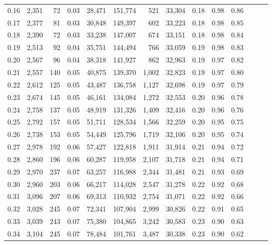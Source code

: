 \begin{tabular}{rrrrrrrrrrrrrr}
0.16 &  2,351 &   72 &  0.03 &   28,471 &  151,774 &     521 &  33,304 &  0.18 &  0.98 &      0.86 \\
0.17 &  2,377 &   81 &  0.03 &   30,848 &  149,397 &     602 &  33,223 &  0.18 &  0.98 &      0.85 \\
0.18 &  2,390 &   72 &  0.03 &   33,238 &  147,007 &     674 &  33,151 &  0.18 &  0.98 &      0.84 \\
0.19 &  2,513 &   92 &  0.04 &   35,751 &  144,494 &     766 &  33,059 &  0.19 &  0.98 &      0.83 \\
0.20 &  2,567 &   96 &  0.04 &   38,318 &  141,927 &     862 &  32,963 &  0.19 &  0.97 &      0.82 \\
0.21 &  2,557 &  140 &  0.05 &   40,875 &  139,370 &   1,002 &  32,823 &  0.19 &  0.97 &      0.80 \\
0.22 &  2,612 &  125 &  0.05 &   43,487 &  136,758 &   1,127 &  32,698 &  0.19 &  0.97 &      0.79 \\
0.23 &  2,674 &  145 &  0.05 &   46,161 &  134,084 &   1,272 &  32,553 &  0.20 &  0.96 &      0.78 \\
0.24 &  2,758 &  137 &  0.05 &   48,919 &  131,326 &   1,409 &  32,416 &  0.20 &  0.96 &      0.76 \\
0.25 &  2,792 &  157 &  0.05 &   51,711 &  128,534 &   1,566 &  32,259 &  0.20 &  0.95 &      0.75 \\
0.26 &  2,738 &  153 &  0.05 &   54,449 &  125,796 &   1,719 &  32,106 &  0.20 &  0.95 &      0.74 \\
0.27 &  2,978 &  192 &  0.06 &   57,427 &  122,818 &   1,911 &  31,914 &  0.21 &  0.94 &      0.72 \\
0.28 &  2,860 &  196 &  0.06 &   60,287 &  119,958 &   2,107 &  31,718 &  0.21 &  0.94 &      0.71 \\
0.29 &  2,970 &  237 &  0.07 &   63,257 &  116,988 &   2,344 &  31,481 &  0.21 &  0.93 &      0.69 \\
0.30 &  2,960 &  203 &  0.06 &   66,217 &  114,028 &   2,547 &  31,278 &  0.22 &  0.92 &      0.68 \\
0.31 &  3,096 &  207 &  0.06 &   69,313 &  110,932 &   2,754 &  31,071 &  0.22 &  0.92 &      0.66 \\
0.32 &  3,028 &  245 &  0.07 &   72,341 &  107,904 &   2,999 &  30,826 &  0.22 &  0.91 &      0.65 \\
0.33 &  3,039 &  243 &  0.07 &   75,380 &  104,865 &   3,242 &  30,583 &  0.23 &  0.90 &      0.63 \\
0.34 &  3,104 &  245 &  0.07 &   78,484 &  101,761 &   3,487 &  30,338 &  0.23 &  0.90 &      0.62 \\

\end{tabular}
